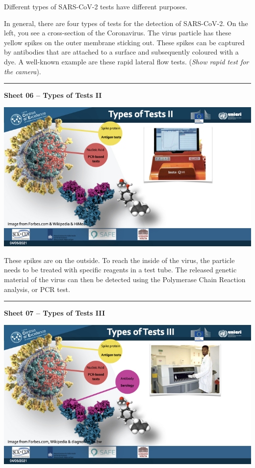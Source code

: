 \documentclass[
]{book}
\begin{document}
Different types of SARS-CoV-2 tests have different purposes.

In general, there are four types of tests for the detection of
SARS-CoV-2. On the left, you see a cross-section of the Coronavirus. The
virus particle has these yellow spikes on the outer membrane sticking
out. These spikes can be captured by antibodies that are attached to a
surface and subsequently coloured with a dye. A well-known example are
these rapid lateral flow tests. (\emph{Show rapid test for the camera}).

\begin{center}\rule{0.5\linewidth}{0.5pt}\end{center}

\textbf{Sheet 06 -- Types of Tests II}

\includegraphics{images/m02/m02_types_of_rapid_tests_final.006.jpeg}

These spikes are on the outside. To reach the inside of the virus, the
particle needs to be treated with specific reagents in a test tube. The
released genetic material of the virus can then be detected using the
Polymerase Chain Reaction analysis, or PCR test.

\begin{center}\rule{0.5\linewidth}{0.5pt}\end{center}

\textbf{Sheet 07 -- Types of Tests III}

\includegraphics{images/m02/m02_types_of_rapid_tests_final.007.jpeg}
\end{document}
